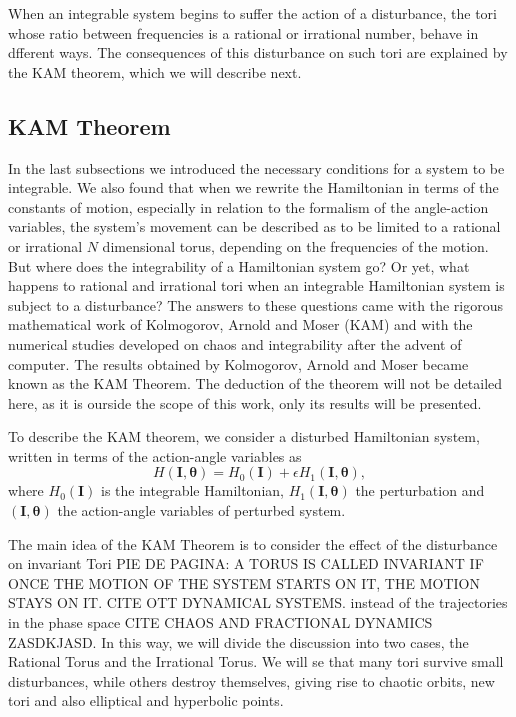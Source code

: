 When an integrable system begins to suffer the action of a disturbance, the tori whose ratio between frequencies is a rational or irrational number, behave in dfferent ways. The consequences of this disturbance on such tori are explained by the KAM theorem, which we will describe next.


\subsection{KAM Theorem}
In the last subsections we introduced the necessary conditions for a system to be integrable. We also found that when we rewrite the Hamiltonian in terms of the constants of motion, especially in relation to the formalism of the angle-action variables, the system's movement can be described as to be limited to a rational or irrational $N$ dimensional torus, depending on the frequencies of the motion. But where does the integrability of a Hamiltonian system go? Or yet, what happens to rational and irrational tori when an integrable Hamiltonian system is subject to a disturbance? The answers to these questions came with the rigorous mathematical work of Kolmogorov, Arnold and Moser (KAM) and with the numerical studies developed on chaos and integrability after the advent of computer. The results obtained by Kolmogorov, Arnold and Moser became known as the KAM Theorem. The deduction of the theorem will not be detailed here, as it is ourside the scope of this work, only its results will be presented.\par

To describe the KAM theorem, we consider a disturbed Hamiltonian system, written in terms of the action-angle variables as
\begin{equation}
H(\bm{I},\bm{\theta})=H_0(\bm{I})+\epsilon H_1(\bm{I},\bm{\theta}),
\end{equation}
where $H_0(\bm{I})$ is the integrable Hamiltonian, $H_1(\bm{I},\bm{\theta})$ the perturbation and $(\bm{I},\bm{\theta})$ the action-angle variables of perturbed system.\par

The main idea of the KAM Theorem is to consider the effect of the disturbance on invariant Tori PIE DE PAGINA: A TORUS IS CALLED INVARIANT IF ONCE THE MOTION OF THE SYSTEM STARTS ON IT, THE MOTION STAYS ON IT. CITE OTT DYNAMICAL SYSTEMS. instead of the trajectories in the phase space CITE CHAOS AND FRACTIONAL DYNAMICS ZASDKJASD. In this way, we will divide the discussion into two cases, the Rational Torus and the Irrational Torus. We will se that many tori survive small disturbances, while others destroy themselves, giving rise to chaotic orbits, new tori and also elliptical and hyperbolic points.



